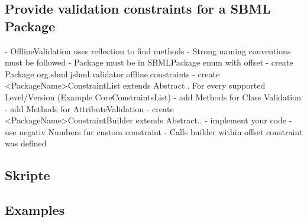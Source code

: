 \subsection{Provide validation constraints for a SBML Package}
- OfflineValidation uses reflection to find methods
	- Strong naming conventions must be followed
- Package must be in SBMLPackage enum with offset
- create Package org.sbml.jsbml.validator.offline.constraints
- create <PackageName>ConstraintList extends Abstract.. For every supported Level/Version (Example CoreConstraintsList)
	- add Methods for Class Validation
	- add Methods for AttributeValidation
- create <PackageName>ConstraintBuilder extends Abstract..
- implement your code
- use negativ Numbers fur custom constraint
	- Calls builder within offset constraint was defined
	
\subsection{Skripte}

\subsection{Examples}